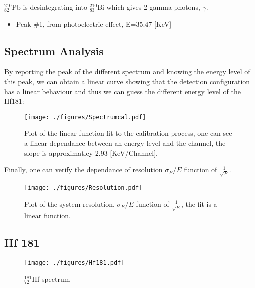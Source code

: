 \documentclass[a4paper,12pt,oneside]{article}
\begin{document}
$_{82}^{210}$Pb is desintegrating into $_{83}^{210}$Bi which gives 2 gamma photons, $\gamma$.

\begin{itemize}
\item Peak \#1, from photoelectric effect, E=35.47 [KeV]
\end{itemize}

\newpage
\subsection{Spectrum Analysis}
By reporting the peak of the different spectrum and knowing the energy level of this peak, we can obtain a linear curve showing that the detection configuration has a linear behaviour and thus we can guess the different energy level of the Hf181:


\begin{figure}[h!]
  \begin{center}
  \texttt{[image: ./figures/Spectrumcal.pdf]}
  \caption{Plot of the linear function fit to the calibration process, one can see a linear dependance between an energy level and the channel, the slope is approximatley 2.93 [KeV/Channel].} \label{fig:calibrate}
  \end{center}
\end{figure}

\newpage
Finally, one can verify the dependance of resolution $\sigma_E/E$ function of $\frac{1}{\sqrt{E}}$.
\begin{figure}[h!]
  \begin{center}
  \texttt{[image: ./figures/Resolution.pdf]}
  \caption{Plot of the system resolution, $\sigma_E/E$ function of $\frac{1}{\sqrt{E}}$, the fit is a linear function.} \label{fig:resolution}
  \end{center}
\end{figure}

\newpage
\subsection{Hf 181}

\begin{figure}[h!]
  \begin{center}
  \texttt{[image: ./figures/Hf181.pdf]}
  \caption{$_{72}^{181}$Hf spectrum} \label{fig:Hf181}
  \end{center}
\end{figure}
\end{document}
